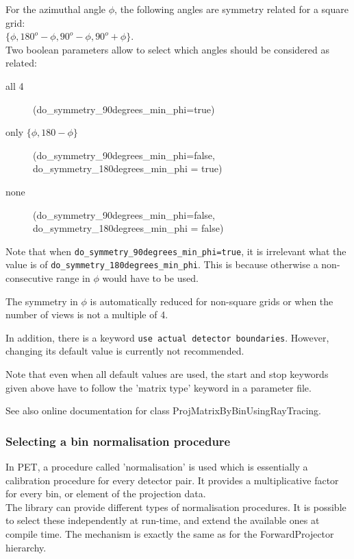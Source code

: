 \documentclass{article}
\begin{document}
For the azimuthal angle $\phi$, the following angles are symmetry 
related for a square grid: \\
$\{\phi, 180^{o}-\phi, 90^{o}-\phi, 90^{o}+\phi\}$.\\
Two boolean parameters allow to select which angles should be 
considered as related:
\begin{description}
\item[all 4]
(do\_symmetry\_90degrees\_min\_phi=true)
\item[only $\{ \phi, 180- \phi \}$]
(do\_symmetry\_90degrees\_min\_phi=false,  \\
do\_symmetry\_180degrees\_min\_phi = true)
\item[none]
(do\_symmetry\_90degrees\_min\_phi=false, \\
do\_symmetry\_180degrees\_min\_phi = false)
\end{description}

Note that when \texttt{do\_symmetry\_90degrees\_min\_phi=true}, 
it is irrelevant what the value is 
of \texttt{do\_symmetry\_180degrees\_min\_phi}. This is because 
otherwise a non-consecutive range in $\phi$ would have to be used.


The symmetry in $\phi$ is automatically reduced for non-square grids 
or when the number of views is not a multiple of 4.



In addition, there is a keyword \texttt{use actual detector boundaries}. 
However, changing its default value is currently not recommended. 




Note that even when all default values are used, the start and 
stop keywords given above have to follow the 'matrix type' keyword 
in a parameter file.


See also online documentation for class ProjMatrixByBinUsingRayTracing. 



\subsubsection{
Selecting a bin normalisation procedure}
\label{sec:binnormalisation}
In PET, a procedure called 'normalisation' is used which is essentially 
a calibration procedure for every detector pair. It provides 
a multiplicative factor for every bin, or element of the projection 
data.\\
The library can provide different types of normalisation procedures. 
It is possible to select these independently at run-time, and 
extend the available ones at compile time. The mechanism is exactly 
the same as for the ForwardProjector hierarchy.
\end{document}
